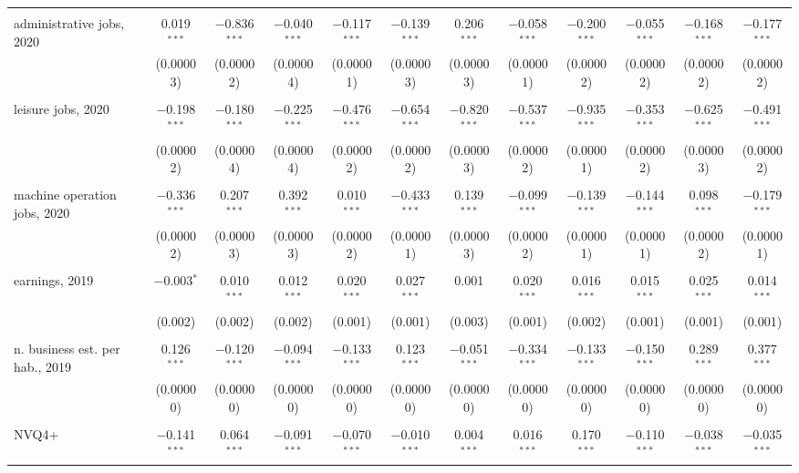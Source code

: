 \documentclass[Royal,times,sageh]{sagej}
\begin{document}
\begin{table}
\begin{tabular}{@{\extracolsep{5pt}}lccccccccccc}
  & & & & & & & & & & & \\ 
 administrative jobs, 2020 & 0.019$^{***}$ & $-$0.836$^{***}$ & $-$0.040$^{***}$ & $-$0.117$^{***}$ & $-$0.139$^{***}$ & 0.206$^{***}$ & $-$0.058$^{***}$ & $-$0.200$^{***}$ & $-$0.055$^{***}$ & $-$0.168$^{***}$ & $-$0.177$^{***}$ \\ 
  & (0.00003) & (0.00002) & (0.00004) & (0.00001) & (0.00003) & (0.00003) & (0.00001) & (0.00002) & (0.00002) & (0.00002) & (0.00002) \\ 
  & & & & & & & & & & & \\ 
 leisure jobs, 2020 & $-$0.198$^{***}$ & $-$0.180$^{***}$ & $-$0.225$^{***}$ & $-$0.476$^{***}$ & $-$0.654$^{***}$ & $-$0.820$^{***}$ & $-$0.537$^{***}$ & $-$0.935$^{***}$ & $-$0.353$^{***}$ & $-$0.625$^{***}$ & $-$0.491$^{***}$ \\ 
  & (0.00002) & (0.00004) & (0.00004) & (0.00002) & (0.00002) & (0.00003) & (0.00002) & (0.00001) & (0.00002) & (0.00003) & (0.00002) \\ 
  & & & & & & & & & & & \\ 
 machine operation jobs, 2020 & $-$0.336$^{***}$ & 0.207$^{***}$ & 0.392$^{***}$ & 0.010$^{***}$ & $-$0.433$^{***}$ & 0.139$^{***}$ & $-$0.099$^{***}$ & $-$0.139$^{***}$ & $-$0.144$^{***}$ & 0.098$^{***}$ & $-$0.179$^{***}$ \\ 
  & (0.00002) & (0.00003) & (0.00003) & (0.00002) & (0.00001) & (0.00003) & (0.00002) & (0.00001) & (0.00001) & (0.00002) & (0.00001) \\ 
  & & & & & & & & & & & \\ 
 earnings, 2019 & $-$0.003$^{*}$ & 0.010$^{***}$ & 0.012$^{***}$ & 0.020$^{***}$ & 0.027$^{***}$ & 0.001 & 0.020$^{***}$ & 0.016$^{***}$ & 0.015$^{***}$ & 0.025$^{***}$ & 0.014$^{***}$ \\ 
  & (0.002) & (0.002) & (0.002) & (0.001) & (0.001) & (0.003) & (0.001) & (0.002) & (0.001) & (0.001) & (0.001) \\ 
  & & & & & & & & & & & \\ 
 n. business est. per hab., 2019 & 0.126$^{***}$ & $-$0.120$^{***}$ & $-$0.094$^{***}$ & $-$0.133$^{***}$ & 0.123$^{***}$ & $-$0.051$^{***}$ & $-$0.334$^{***}$ & $-$0.133$^{***}$ & $-$0.150$^{***}$ & 0.289$^{***}$ & 0.377$^{***}$ \\ 
  & (0.00000) & (0.00000) & (0.00000) & (0.00000) & (0.00000) & (0.00000) & (0.00000) & (0.00000) & (0.00000) & (0.00000) & (0.00000) \\ 
  & & & & & & & & & & & \\ 
 NVQ4+ & $-$0.141$^{***}$ & 0.064$^{***}$ & $-$0.091$^{***}$ & $-$0.070$^{***}$ & $-$0.010$^{***}$ & 0.004$^{***}$ & 0.016$^{***}$ & 0.170$^{***}$ & $-$0.110$^{***}$ & $-$0.038$^{***}$ & $-$0.035$^{***}$ \\ 

\end{tabular}
\end{table}
\end{document}
